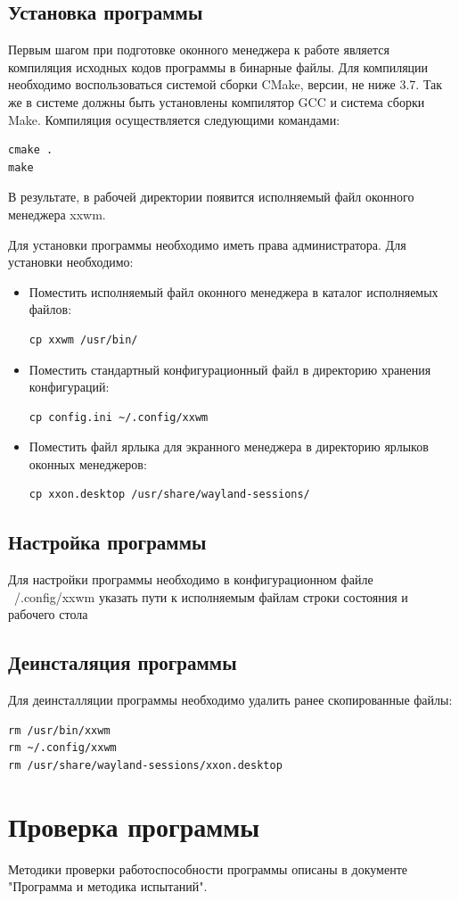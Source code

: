 \documentclass[10pt,a4paper]{report}
\begin{document}
\subsection{Установка программы}
Первым шагом при подготовке оконного менеджера к работе является компиляция исходных кодов программы в бинарные файлы. Для компиляции необходимо воспользоваться системой сборки CMake, версии, не ниже 3.7. Так же в системе должны быть установлены компилятор GCC и система сборки Make.
Компиляция осуществляется следующими командами:
\begin{verbatim}
cmake .
make
\end{verbatim}
В результате, в рабочей директории появится исполняемый файл оконного менеджера xxwm.
					
Для установки программы необходимо иметь права администратора. Для установки необходимо:
\begin{itemize}
\item Поместить исполняемый файл оконного менеджера в каталог исполняемых файлов:
\begin{verbatim}
cp xxwm /usr/bin/
\end{verbatim}
\item Поместить стандартный конфигурационный файл в директорию хранения конфигураций:
\begin{verbatim}
cp config.ini ~/.config/xxwm
\end{verbatim}
\item Поместить файл ярлыка для экранного менеджера в директорию ярлыков оконных менеджеров:
\begin{verbatim}
cp xxon.desktop /usr/share/wayland-sessions/
\end{verbatim}
\end{itemize}

\subsection{Настройка программы}
Для настройки программы необходимо в конфигурационном файле ~/.config/xxwm указать пути к исполняемым файлам строки состояния и рабочего стола
				
\subsection{Деинсталяция программы}
Для деинсталляции программы необходимо удалить ранее скопированные файлы:
\begin{verbatim}
rm /usr/bin/xxwm
rm ~/.config/xxwm
rm /usr/share/wayland-sessions/xxon.desktop
\end{verbatim}

\section{Проверка программы}
Методики проверки работоспособности программы описаны в документе "Программа и методика испытаний".
			 
\end{document}
